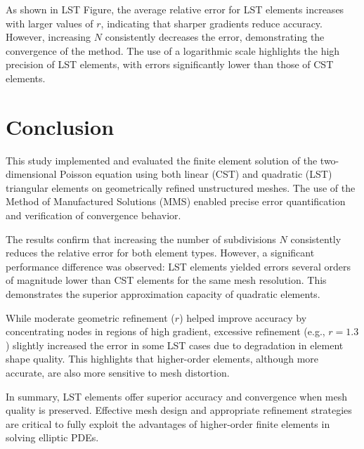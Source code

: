 \documentclass[12pt]{article}
\begin{document}
\vspace{0.3cm}
\noindent
As shown in LST Figure, the average relative error for LST elements increases with larger values of $r$, indicating that sharper gradients reduce accuracy. However, increasing $N$ consistently decreases the error, demonstrating the convergence of the method. The use of a logarithmic scale highlights the high precision of LST elements, with errors significantly lower than those of CST elements.



\newpage
\section{Conclusion}

This study implemented and evaluated the finite element solution of the two-dimensional Poisson equation using both linear (CST) and quadratic (LST) triangular elements on geometrically refined unstructured meshes. The use of the Method of Manufactured Solutions (MMS) enabled precise error quantification and verification of convergence behavior.

The results confirm that increasing the number of subdivisions $N$ consistently reduces the relative error for both element types. However, a significant performance difference was observed: LST elements yielded errors several orders of magnitude lower than CST elements for the same mesh resolution. This demonstrates the superior approximation capacity of quadratic elements.

While moderate geometric refinement ($r$) helped improve accuracy by concentrating nodes in regions of high gradient, excessive refinement (e.g., $r = 1.3$) slightly increased the error in some LST cases due to degradation in element shape quality. This highlights that higher-order elements, although more accurate, are also more sensitive to mesh distortion.

In summary, LST elements offer superior accuracy and convergence when mesh quality is preserved. Effective mesh design and appropriate refinement strategies are critical to fully exploit the advantages of higher-order finite elements in solving elliptic PDEs.

\newpage
\nocite{wikipedia_galerkin}
\nocite{wikipedia_weakform}


\end{document}
